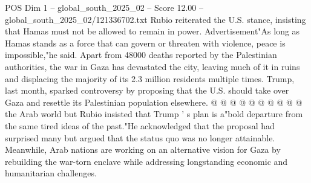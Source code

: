 \begin{textsample}{POS Dim 1 – global\_south\_2025\_02 – Score 12.00 – global\_south\_2025\_02/121336702.txt}
Rubio reiterated the U.S. stance, insisting that Hamas must not be allowed to remain in power.
Advertisement"As long as Hamas stands as a force that can govern or threaten with violence, peace is impossible,"he said.
Apart from 48000 deaths reported by the Palestinian authorities, the war in Gaza has devastated the city, leaving much of it in ruins and displacing the majority of its 2.3 million residents multiple times.
Trump, last month, sparked controversy by proposing that the U.S. should take over Gaza and resettle its Palestinian population elsewhere. @ @ @ @ @ @ @ @ @ @ the Arab world but Rubio insisted that Trump ' s plan is a"bold departure from the same tired ideas of the past."He acknowledged that the proposal had surprised many but argued that the status quo was no longer attainable.
Meanwhile, Arab nations are working on an alternative vision for Gaza by rebuilding the war-torn enclave while addressing longstanding economic and humanitarian challenges.

\end{textsample}
